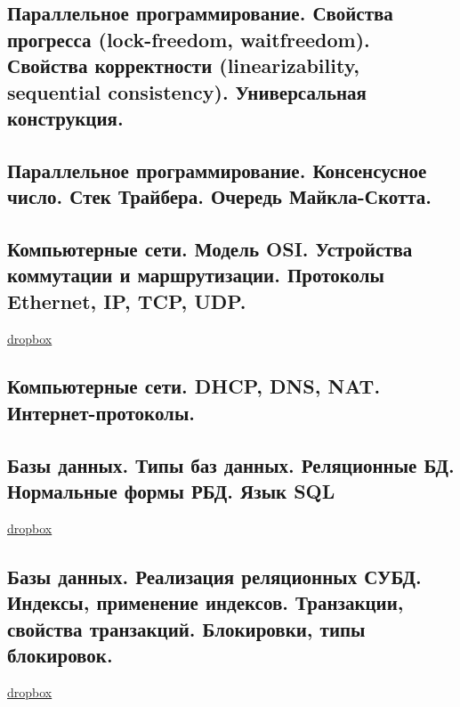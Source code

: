 \documentclass{article}
\begin{document}
\subsection{Параллельное программирование. Свойства прогресса (lock-freedom, waitfreedom). Свойства корректности (linearizability, sequential consistency). Универсальная конструкция.}

\subsection{Параллельное программирование. Консенсусное число. Стек Трайбера. Очередь Майкла-Скотта.}

\subsection{Компьютерные сети. Модель OSI. Устройства коммутации и маршрутизации. Протоколы Ethernet, IP, TCP, UDP.}

\href{https://www.dropbox.com/sh/4st5b16mvdf8gkj/AAAI9sbKs_C3TFgRbqWGrAeca/Programming/16%20%D0%9A%D0%BE%D0%BC%D0%BF%D1%8C%D1%8E%D1%82%D0%B5%D1%80%D0%BD%D1%8B%D0%B5%20%D1%81%D0%B5%D1%82%D0%B8.pdf?dl=0}{dropbox}

\subsection{Компьютерные сети. DHCP, DNS, NAT. Интернет-протоколы.}

\subsection{Базы данных. Типы баз данных. Реляционные БД. Нормальные формы РБД. Язык SQL}

\href{https://www.dropbox.com/sh/4st5b16mvdf8gkj/AACJWcRNv0lFmPzhlkMSxN7Va/Programming/12%20%D0%91%D0%B0%D0%B7%D1%8B%20%D0%B4%D0%B0%D0%BD%D0%BD%D1%8B%D1%85.pdf?dl=0}{dropbox}

\subsection{Базы данных. Реализация реляционных СУБД. Индексы, применение индексов. Транзакции, свойства транзакций. Блокировки, типы блокировок.}

\href{https://www.dropbox.com/sh/4st5b16mvdf8gkj/AADo-NrUSL5vJLWDfeAFWwy1a/Programming/13%20%D0%A0%D0%B5%D0%BB%D1%8F%D1%86%D0%B8%D0%BE%D0%BD%D0%BD%D1%8B%D0%B5%20%D0%A1%D0%A3%D0%91%D0%94.pdf?dl=0}{dropbox}
\end{document}
